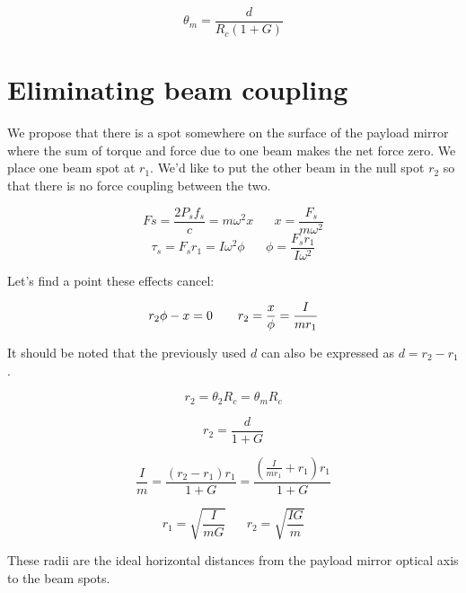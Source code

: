 $$\theta_m = \frac{d}{R_c(1+G)}$$

\section{Eliminating beam coupling}

We propose that there is a spot somewhere on the surface of the payload mirror where the sum of torque and force due to one beam makes the net force zero.  We place one beam spot at $r_1$.  We'd like to put the other beam in the null spot $r_2$ so that there is no force coupling between the two.  

$$Fs=\frac{2P_sf_s}{c} = m\omega^2x \hspace{20pt} x = \frac{F_s}{m\omega^2}$$ 
$$\tau_s = F_sr_1=I\omega^2\phi \hspace{20pt} \phi = \frac{F_s r_1}{I\omega^2}$$

Let's find a point these effects cancel:

$$r_2\phi-x=0 \hspace{20 pt} r_2=\frac{x}{\phi}=\frac{I}{mr_1}$$

It should be noted that the previously used $d$ can also be expressed as $d =r_2-r_1$.

$$r_2 = \theta_2R_c = \theta_mR_c$$

$$r_2 = \frac{d}{1+G}$$

$$\frac{I}{m} = \frac{(r_2-r_1)r_1}{1+G} = \frac{\left(\frac{I}{mr_1}+r_1\right)r_1}{1+G}$$

$$r_1 = \sqrt{\frac{I}{mG}} \hspace{20pt} r_2 = \sqrt{\frac{IG}{m}}$$

These radii are the ideal horizontal distances from the payload mirror optical axis to the beam spots.



%